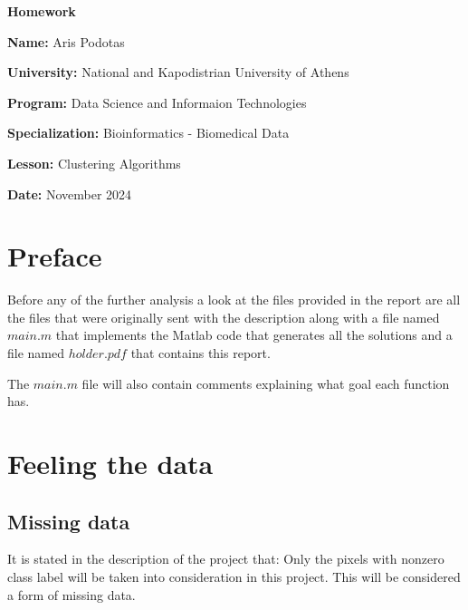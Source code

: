 \documentclass[12pt, a4paper]{article}
\begin{document}
\begin{titlepage}
    \centering
    {\huge \textbf{Homework}\par}
    \vspace{0.5cm}
    {\Large \textbf{Name:} Aris Podotas\par}
    \vspace{0.5cm}
    {\large \textbf{University:} National and Kapodistrian University of Athens\par}
    \vspace{0.5cm}
    {\large \textbf{Program:} Data Science and Informaion Technologies\par}
    \vspace{0.5cm}
    {\large \textbf{Specialization:} Bioinformatics - Biomedical Data\par}
    \vspace{0.5cm}
    {\large \textbf{Lesson:} Clustering Algorithms \par}
    \vspace{0.5cm}
    {\large \textbf{Date:} November 2024\par}
    \tableofcontents
\end{titlepage}

\section{Preface}

Before any of the further analysis a look at the files provided in the report are all the files that were originally sent with the description along with a file named $main.m$ that implements the Matlab code that generates all the solutions and a file named $holder.pdf$ that contains this report.
\newline

The $main.m$ file will also contain comments explaining what goal each function has.

\section{Feeling the data}

\subsection{Missing data}

It is stated in the description of the project that: Only the pixels with nonzero class label will be taken into consideration in this project. This will be considered a form of missing data.
\newline
\end{document}
